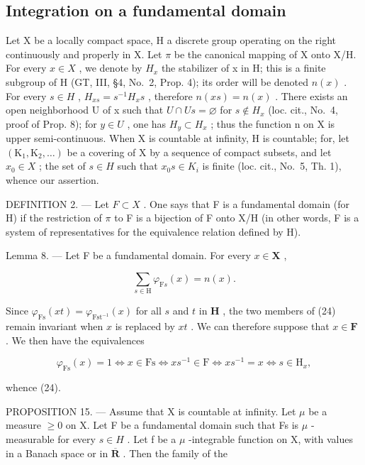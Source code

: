 \subsection{Integration on a fundamental domain}

Let X be a locally compact space, H a discrete group operating on the right continuously and properly in X. Let \(\pi\) be the canonical mapping of X onto X/H. For every \(x \in X\) , we denote by \(H_x\) the stabilizer of x in H; this is a finite subgroup of H (GT, III, §4, No.~2, Prop. 4); its order will be denoted \(n(x)\) . For every \(s \in H\) , \(H_{xs} = s^{-1}H_x s\) , therefore \(n(xs) = n(x)\) . There exists an open neighborhood U of x such that \(U \cap Us = \varnothing\) for \(s \notin H_x\) (loc. cit., No.~4, proof of Prop. 8); for \(y \in U\) , one has \(H_y \subset H_x\) ; thus the function n on X is upper semi-continuous. When X is countable at infinity, H is countable; for, let \((\mathrm{K}_1, \mathrm{K}_2, \ldots)\) be a covering of X by a sequence of compact subsets, and let \(x_{0} \in X\) ; the set of \(s \in H\) such that \(x_{0}s \in K_{i}\) is finite (loc. cit., No.~5, Th. 1), whence our assertion.

DEFINITION 2. --- Let \(F \subset X\) . One says that F is a fundamental domain (for H) if the restriction of \(\pi\) to F is a bijection of F onto X/H (in other words, F is a system of representatives for the equivalence relation defined by H).

Lemma 8. --- Let F be a fundamental domain. For every \(x \in \mathbf{X}\) ,

\[
\sum_ {s \in \mathrm{H}} \varphi_ {\mathrm{F} s} (x) = n (x).\tag{24}
\]

Since \(\varphi_{\mathrm{Fs}}(xt) = \varphi_{\mathrm{Fst}^{-1}}(x)\) for all \(s\) and \(t\) in \(\mathbf{H}\) , the two members of (24) remain invariant when \(x\) is replaced by \(xt\) . We can therefore suppose that \(x \in \mathbf{F}\) . We then have the equivalences

\[
\varphi_ {\mathrm{Fs}} (x) = 1 \Leftrightarrow x \in \mathrm{Fs} \Leftrightarrow x s ^ {- 1} \in \mathrm{F} \Leftrightarrow x s ^ {- 1} = x \Leftrightarrow s \in \mathrm{H} _ {x},
\]

whence (24).

PROPOSITION 15. --- Assume that X is countable at infinity. Let \(\mu\) be a measure \(\geqslant 0\) on X. Let F be a fundamental domain such that Fs is \(\mu\) -measurable for every \(s \in H\) . Let f be a \(\mu\) -integrable function on X, with values in a Banach space or in \(\overline{\mathbf{R}}\) . Then the family of the

